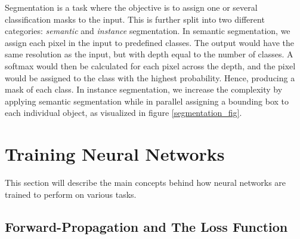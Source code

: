     Segmentation is a task where the objective is to assign one or several classification masks to the input\cite{He_2017_ICCV_segmentation}. This is further split into two different categories: \textit{semantic} and \textit{instance} segmentation. In semantic segmentation, we assign each pixel in the input to predefined classes. The output would have the same resolution as  the input, but with depth equal to the number of classes. A softmax would then be calculated for each pixel across the depth, and the pixel would be assigned to the class with the highest probability. Hence, producing a mask of each class. In instance segmentation, we increase the complexity by applying semantic segmentation while in parallel assigning a bounding box to each individual object, as visualized in figure \ref{segmentation_fig}.
    
\section{Training Neural Networks} \label{training neural networks}
    This section will describe the main concepts behind how neural networks are trained to perform on various tasks. 

\subsection{Forward-Propagation and The Loss Function}

